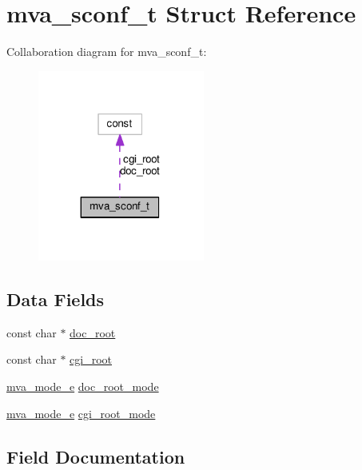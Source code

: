 \hypertarget{structmva__sconf__t}{}\section{mva\+\_\+sconf\+\_\+t Struct Reference}
\label{structmva__sconf__t}


Collaboration diagram for mva\+\_\+sconf\+\_\+t\+:
\nopagebreak
\begin{figure}[H]
\begin{center}
\leavevmode
\includegraphics[width=155pt]{structmva__sconf__t__coll__graph}
\end{center}
\end{figure}
\subsection*{Data Fields}
\begin{DoxyCompactItemize}
\item 
const char $\ast$ \hyperlink{structmva__sconf__t_acd2f5b7f4969410371331f8a54679ef5}{doc\+\_\+root}
\item 
const char $\ast$ \hyperlink{structmva__sconf__t_aa350394f659834b41c8474b59ffc3f6d}{cgi\+\_\+root}
\item 
\hyperlink{mod__vhost__alias_8c_aed3b8c70cbd699ed13f102e2eaa5c610}{mva\+\_\+mode\+\_\+e} \hyperlink{structmva__sconf__t_a088901826ec13c01458299a052be62e2}{doc\+\_\+root\+\_\+mode}
\item 
\hyperlink{mod__vhost__alias_8c_aed3b8c70cbd699ed13f102e2eaa5c610}{mva\+\_\+mode\+\_\+e} \hyperlink{structmva__sconf__t_a0a6b7c57321b41fe3e06d1fbfb8a169f}{cgi\+\_\+root\+\_\+mode}
\end{DoxyCompactItemize}


\subsection{Field Documentation}
